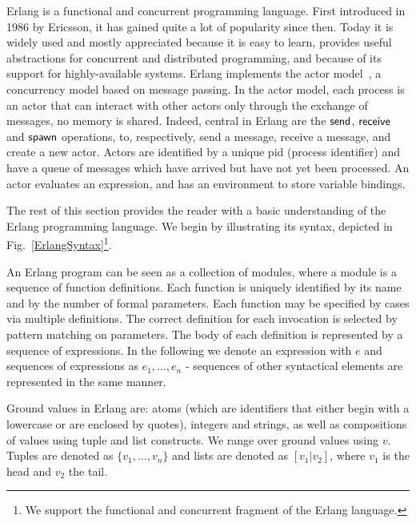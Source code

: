\documentclass{article}[12pt,a4paper]
\theoremstyle{definition}
\begin{document}
Erlang is a functional and concurrent programming language. First
introduced in 1986 by Ericsson, it has gained quite a lot of
popularity since then.  Today it is widely used and mostly appreciated
because it is easy to learn, provides useful abstractions for
concurrent and distributed programming, and because of its support for
highly-available systems. Erlang implements the actor model~\cite{Hewitt73}, a
concurrency model based on message passing. In the actor model, each
process is an actor that can interact with other actors
only through the exchange of messages, no memory is shared. Indeed,
central in Erlang are the $\mathsf{send}$, $\mathsf{receive}$ and $\mathsf{spawn}$
operations, to, respectively, send a message, receive a message, and
create a new actor. Actors are identified by a unique pid (process identifier) and have a queue of messages which have arrived but have not yet been processed.
An actor evaluates an expression, and has an environment to store variable bindings.

The rest of this section provides the reader with a basic understanding
of the Erlang programming language. We begin by illustrating its syntax, depicted in
Fig.~\ref{ErlangSyntax}\footnote{We support the functional and concurrent fragment of the
  Erlang language.}. 

An Erlang program can be seen as a collection of modules, where a module is a sequence of function definitions. Each function is uniquely identified by its name and by the
number of formal parameters. Each function may be specified by cases via multiple definitions. The correct definition for each invocation is selected by pattern matching on parameters. The body of each definition is represented
by a sequence of expressions. In the following we denote an expression with $e$
and sequences of expressions as $e_1,\ldots,e_n$  - sequences of other
syntactical elements are represented in the same manner.  

Ground values in Erlang are: atoms (which are identifiers that either
begin with a lowercase or are enclosed by quotes), integers and
strings, as well as compositions of values using tuple and list
constructs. We range over ground values using $v$. Tuples are denoted
as $\{v_1,\ldots,v_n\}$ and lists are denoted as
$[v_1|v_2]$, where $v_1$ is the head and $v_2$ the tail.
\end{document}
